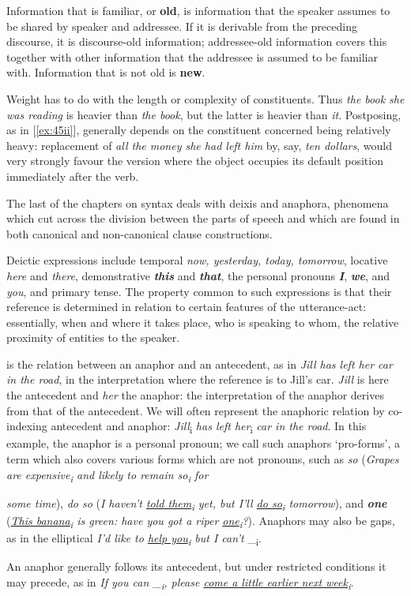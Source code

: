 Information that is {familiar}, or \textbf{old}, is information that the speaker assumes to be shared by speaker and addressee. If it is derivable from the preceding discourse, it is {discourse-old information}; {addressee-old information} covers this together with other information that the addressee is assumed to be familiar with. Information that is not old is \textbf{new}.

{Weight} has to do with the length or complexity of constituents. Thus \textit{the book she was reading} is heavier than \textit{the book}, but the latter is heavier than \textit{it}. Postposing, as in [\ref{ex:45ii}], generally depends on the constituent concerned being relatively heavy: replacement of \textit{all the money she had left him} by, say, \textit{ten dollars}, would very strongly favour the version where the object occupies its default position immediately after the verb.


The last of the chapters on syntax deals with deixis and anaphora, phenomena which cut across the division between the parts of speech and which are found in both canonical and non-canonical clause constructions.

{Deictic} expressions include temporal \textit{now, yesterday, today, tomorrow}, locative \textit{here} and \textit{there}, demonstrative \textit{\textbf{this}} and \textit{\textbf{that}}, the personal pronouns \textit{\textbf{I}}, \textit{\textbf{we}}, and \textit{you}, and primary tense. The property common to such expressions is that their reference is determined in relation to certain features of the utterance-act: essentially, when and where it takes place, who is speaking to whom, the relative proximity of entities to the speaker.

{ is the relation between an {anaphor} and an {antecedent}, as in \textit{Jill has left her car in the road}, in the interpretation where the reference is to Jill's car. \textit{Jill} is here the antecedent and \textit{her} the anaphor: the interpretation of the anaphor derives from that of the antecedent. We will often represent the anaphoric relation by co-indexing antecedent and anaphor:} \textit{Jill}\textsubscript{i} \textit{has left her}\textsubscript{i} \textit{car in the road}. In this example, the anaphor is a personal pronoun; we call such anaphors `{pro-forms}', a term which also covers various forms which are not pronouns, such as \textit{so} (\textit{Grapes are expensive\textsubscript{i} and likely to remain so\textsubscript{i} for}

\newpage

\noindent \textit{some time}), \textit{do so} (\textit{I haven't \uline{told them}\textsubscript{i} yet, but I'll \uline{do so}\textsubscript{i} tomorrow}), and \textit{\textbf{one}} (\textit{\uline{This banana}\textsubscript{i} is green: have you got a riper \uline{one}\textsubscript{i}?}). Anaphors may also be gaps, as in the elliptical \textit{I'd like to \uline{help you}\textsubscript{i} but I can't} \_\textsubscript{i}.

An anaphor generally follows its antecedent, but under restricted conditions it may precede, as in \textit{If you can \_\textsubscript{i}, please \uline{come a little earlier next week}\textsubscript{i}}.